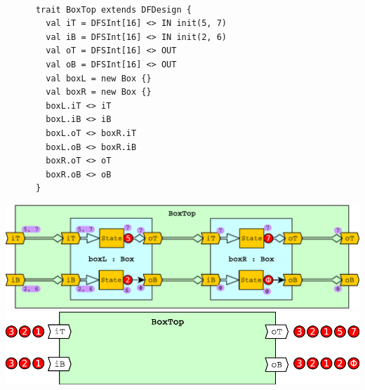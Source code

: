 \begin{table}[t]
\begin{minipage}[t][9cm][t]{0.34\linewidth}
\begin{verbatim}
      
      trait BoxTop extends DFDesign {
        val iT = DFSInt[16] <> IN init(5, 7)
        val iB = DFSInt[16] <> IN init(2, 6)
        val oT = DFSInt[16] <> OUT
        val oB = DFSInt[16] <> OUT
        val boxL = new Box {}
        val boxR = new Box {}
        boxL.iT <> iT      
        boxL.iB <> iB
        boxL.oT <> boxR.iT 
        boxL.oB <> boxR.iB
        boxR.oT <> oT      
        boxR.oB <> oB
      }
    \end{verbatim}
    \vfill
    \label{fig:BoxTopCode}
  \end{minipage}%
  \hfill
  \begin{minipage}[t][9cm][b]{0.64\linewidth}
    \centering
    \captionsetup{justification=centering}
    \includegraphics[width=\linewidth]{graphics/connectivity.pdf}
    \vfill
    \label{fig:BoxTopDraw}
    \includegraphics[width=0.8\linewidth]{graphics/connectivityTokens.pdf}
    \label{fig:BoxTopTokens}
  \end{minipage}

\end{table}
